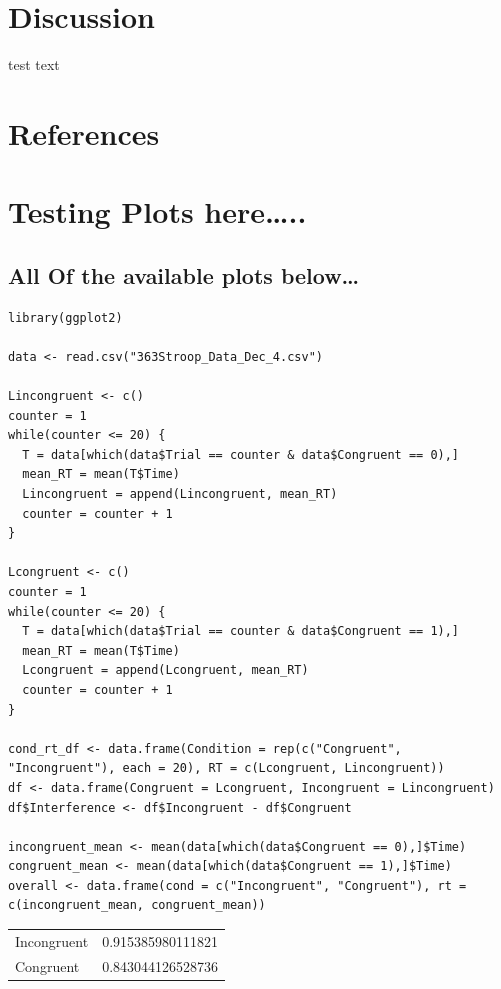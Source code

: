 \documentclass{article}
\begin{document}
\section{Discussion}
\label{sec:orgb16d0c7}
test text
\section{References}
\label{sec:orga19b6d5}



\section{Testing Plots here\ldots{}..}
\label{sec:orge207852}

\subsection{All Of the available plots below\ldots{}}
\label{sec:orgc919894}


\begin{verbatim}
library(ggplot2)

data <- read.csv("363Stroop_Data_Dec_4.csv")

Lincongruent <- c()
counter = 1
while(counter <= 20) {
  T = data[which(data$Trial == counter & data$Congruent == 0),]
  mean_RT = mean(T$Time)
  Lincongruent = append(Lincongruent, mean_RT)
  counter = counter + 1
}

Lcongruent <- c()
counter = 1
while(counter <= 20) {
  T = data[which(data$Trial == counter & data$Congruent == 1),]
  mean_RT = mean(T$Time)
  Lcongruent = append(Lcongruent, mean_RT)
  counter = counter + 1
}

cond_rt_df <- data.frame(Condition = rep(c("Congruent", "Incongruent"), each = 20), RT = c(Lcongruent, Lincongruent))
df <- data.frame(Congruent = Lcongruent, Incongruent = Lincongruent)
df$Interference <- df$Incongruent - df$Congruent

incongruent_mean <- mean(data[which(data$Congruent == 0),]$Time)
congruent_mean <- mean(data[which(data$Congruent == 1),]$Time)
overall <- data.frame(cond = c("Incongruent", "Congruent"), rt = c(incongruent_mean, congruent_mean))

\end{verbatim}

\begin{center}
\begin{tabular}{lr}
Incongruent & 0.915385980111821\\
Congruent & 0.843044126528736\\
\end{tabular}
\end{center}
\end{document}

